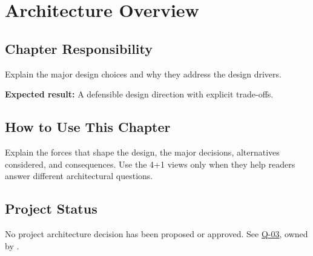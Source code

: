 \chapter{Architecture Overview}
\section{Chapter Responsibility}
\label{Section:ArchitectureOverviewResponsibility}
Explain the major design choices and why they address the design drivers.

\noindent\textbf{Expected result:} A defensible design direction with explicit trade-offs.

\section{How to Use This Chapter}
Explain the forces that shape the design, the major decisions, alternatives considered, and consequences. Use the 4+1 views only when they help readers answer different architectural questions.

\section{Project Status}
No project architecture decision has been proposed or approved.
See \hyperref[Question:Q-03]{Q-03}, owned by \DocumentOwner.
